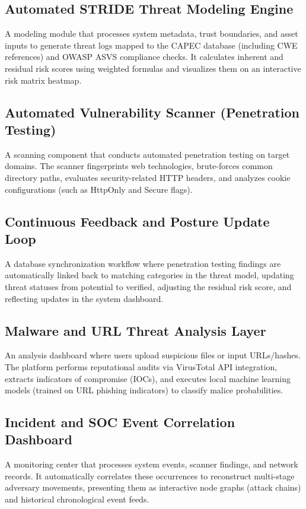 \subsection{Automated STRIDE Threat Modeling Engine}
A modeling module that processes system metadata, trust boundaries, and asset inputs to generate threat logs mapped to the CAPEC database (including CWE references) and OWASP ASVS compliance checks. It calculates inherent and residual risk scores using weighted formulas and visualizes them on an interactive risk matrix heatmap.

\subsection{Automated Vulnerability Scanner (Penetration Testing)}
A scanning component that conducts automated penetration testing on target domains. The scanner fingerprints web technologies, brute-forces common directory paths, evaluates security-related HTTP headers, and analyzes cookie configurations (such as HttpOnly and Secure flags).

\subsection{Continuous Feedback and Posture Update Loop}
A database synchronization workflow where penetration testing findings are automatically linked back to matching categories in the threat model, updating threat statuses from potential to verified, adjusting the residual risk score, and reflecting updates in the system dashboard.

\subsection{Malware and URL Threat Analysis Layer}
An analysis dashboard where users upload suspicious files or input URLs/hashes. The platform performs reputational audits via VirusTotal API integration, extracts indicators of compromise (IOCs), and executes local machine learning models (trained on URL phishing indicators) to classify malice probabilities.

\subsection{Incident and SOC Event Correlation Dashboard}
A monitoring center that processes system events, scanner findings, and network records. It automatically correlates these occurrences to reconstruct multi-stage adversary movements, presenting them as interactive node graphs (attack chains) and historical chronological event feeds.

